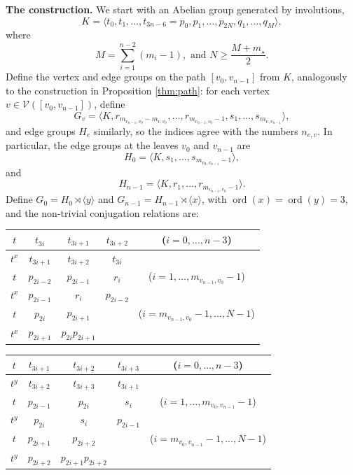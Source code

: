 \documentclass[12pt,leqno]{amsart}
\newcommand{\2}{L^2_{\rm per}(0, T)}
\newcommand{\ord}{{\operatorname{ord}}}
\numberwithin{equation}{section}
\numberwithin{figure}{section}
\begin{document}
\textbf{The construction.} We start with an Abelian group generated by involutions,
\[
K = \langle t_0,t_1,\dots,t_{3n-6}=p_0,p_1,\dots,p_{2N},q_1,\dots,q_M\rangle,
\]
where 
\[
M = \sum_{i=1}^{n-2} (m_i-1),\text{ and }N \geq \frac{M+m_\star}{2}.
\]
Define the vertex and edge groups on the path $[v_0,v_{n-1}]$ from $K$, analogously to the construction in Proposition \ref{thm:path}: for each vertex $v\in\mathcal{V}([v_0,v_{n-1}])$, define
\[
G_v = \langle K, r_{m_{v_{n-1},v_0}-m_{v,v_0}},\dots, r_{m_{v_{n-1},v_0}-1}, s_1,\dots, s_{m_{v,v_{n-1}}}\rangle,
\]
and edge groups $H_e$ similarly, so the indices agree with the numbers $n_{e,v}$. In particular, the edge groups at the leaves $v_0$ and $v_{n-1}$ are
\[
H_0 = \langle K, s_1,\dots, s_{m_{v_0,v_{n-1}}-1}\rangle,
\]
and
\[
H_{n-1} = \langle K, r_1,\dots, r_{m_{v_{n-1},v_0}-1} \rangle.
\]
Define $G_0 = H_0\rtimes\langle y\rangle$ and $G_{n-1} = H_{n-1}\rtimes \langle x\rangle$, with $\ord(x) = \ord(y) = 3$, and the non-trivial conjugation relations are:
\begin{center}
    \begin{tabular}{c||c|c|cc}
        $t$ & $t_{3i}$ & $t_{3i+1}$ & $t_{3i+2}$ & ($i=0,\dots,n-3$) \\
        \hline
        $t^x$ & $t_{3i+1}$ & $t_{3i+2}$ & $t_{3i}$ \\
        \hline
        $t$ & $p_{2i-2}$ & $p_{2i-1}$ & $r_i$ & ($i=1,\dots,m_{v_{n-1},v_0}-1$) \\
        \hline
        $t^x$ & $p_{2i-1}$ & $r_i$ & $p_{2i-2}$ \\
        \hline
        $t$ & $p_{2i}$ & $p_{2i+1}$ & & ($i= m_{v_{n-1},v_0}-1,...,N-1$) \\
        \hline
        $t^x$ & $p_{2i+1}$ & $p_{2i}p_{2i+1}$
    \end{tabular}
\end{center}
\begin{center}
    \begin{tabular}{c||c|c|cc}
        $t$ & $t_{3i+1}$ & $t_{3i+2}$ & $t_{3i+3}$ & ($i=0,\dots,n-3$) \\
        \hline
        $t^y$ & $t_{3i+2}$ & $t_{3i+3}$ & $t_{3i+1}$ \\
        \hline
        $t$ & $p_{2i-1}$ & $p_{2i}$ & $s_i$ & ($i=1,\dots,m_{v_0,v_{n-1}}-1$) \\
        \hline
        $t^y$ & $p_{2i}$ & $s_i$ & $p_{2i-1}$ \\
        \hline
        $t$ & $p_{2i+1}$ & $p_{2i+2}$ & & ($i= m_{v_0,v_{n-1}}-1,...,N-1$) \\
        \hline
        $t^y$ & $p_{2i+2}$ & $p_{2i+1}p_{2i+2}$
    \end{tabular}
\end{center}
\end{document}
